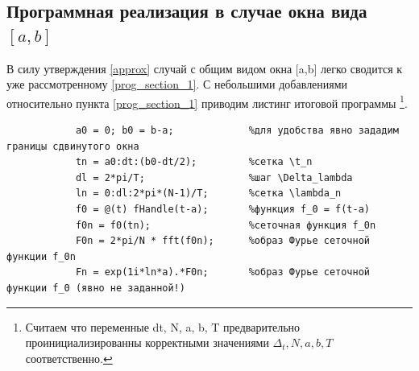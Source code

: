 \documentclass[oneside,final,11pt]{article}
\newcommand\segm[2]{[#1,#2]}
\begin{document}
	\subsection{Программная реализация в случае окна вида \(\segm{a}{b}\)}
		В силу утверждения \eqref{approx} случай с общим видом окна \segm{a}{b} легко сводится к уже рассмотренному
		\ref{prog_section_1}. С небольшими добавлениями относительно пункта \ref{prog_section_1}
		приводим листинг итоговой программы
		\footnote{Считаем что переменные dt, N, a, b, T предварительно проинициализированны корректными значениями
		\( \Delta_t, N, a, b, T \) соответственно.
		}. \par
		\begin{verbatim}
			a0 = 0; b0 = b-a;             %для удобства явно зададим границы сдвинутого окна
			tn = a0:dt:(b0-dt/2);         %сетка \t_n
			dl = 2*pi/T;                  %шаг \Delta_lambda
			ln = 0:dl:2*pi*(N-1)/T;       %сетка \lambda_n
			f0 = @(t) fHandle(t-a);       %функция f_0 = f(t-a)
			f0n = f0(tn);                 %сеточная функция f_0n
			F0n = 2*pi/N * fft(f0n);      %образ Фурье сеточной функции f_0n
			Fn = exp(1i*ln*a).*F0n;       %образ Фурье сеточной функции f_0 (явно не заданной!)
		\end{verbatim}
		
\end{document}
